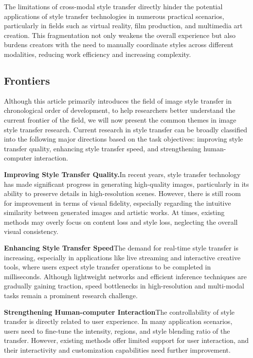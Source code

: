 \documentclass[preprint,12pt]{elsarticle}
\begin{document}
The limitations of cross-modal style transfer directly hinder the potential applications of style transfer technologies in numerous practical scenarios, particularly in fields such as virtual reality, film production, and multimedia art creation. This fragmentation not only weakens the overall experience but also burdens creators with the need to manually coordinate styles across different modalities, reducing work efficiency and increasing complexity.
% 
\subsection{Frontiers}

Although this article primarily introduces the field of image style transfer in chronological order of development, to help researchers better understand the current frontier of the field, we will now present the common themes in image style transfer research. Current research in style transfer can be broadly classified into the following major directions based on the task objectives: improving style transfer quality, enhancing style transfer speed, and strengthening human-computer interaction.

\textbf{Improving Style Transfer Quality.}\quad In recent years, style transfer technology has made significant progress in generating high-quality images\citep{50li2023compact,50li2023compact,47wu2023preserving,118wen2023cap,54hong2023aespa,55zhu2023all,112huang2023quantart}, particularly in its ability to preserve details in high-resolution scenes. However, there is still room for improvement in terms of visual fidelity, especially regarding the intuitive similarity between generated images and artistic works. At times, existing methods may overly focus on content loss and style loss, neglecting the overall visual consistency.

\textbf{Enhancing Style Transfer Speed}\quad The demand for real-time style transfer is increasing, especially in applications like live streaming and interactive creative tools, where users expect style transfer operations to be completed in milliseconds. Although lightweight networks and efficient inference techniques are gradually gaining traction\citep{50li2023compact,72wang2023microast,78lin2023adacm,114tang2023master}, speed bottlenecks in high-resolution and multi-modal tasks remain a prominent research challenge.

\textbf{Strengthening Human-computer Interaction}\quad The controllability of style transfer\citep{52wang2023interactive,78lin2023adacm,03li2023frequency,80cheng2023user,62zhang2023inversion,64wang2023stylediffusion} is directly related to user experience. In many application scenarios, users need to fine-tune the intensity, regions, and style blending ratio of the transfer. However, existing methods offer limited support for user interaction, and their interactivity and customization capabilities need further improvement.
\end{document}
